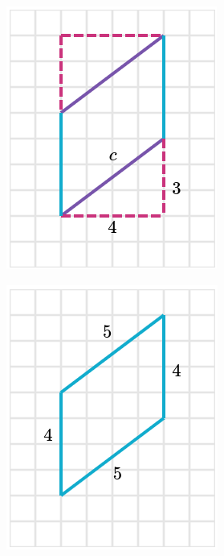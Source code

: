 \begin{solutionbox}{16cm}
\begin{minipage}{0.4\textwidth}
\begin{multicols}{2}
\begin{figure}[H]
                \includegraphics[width=0.9\linewidth]{../images/peri_paralelogramo_01c.png}
                \caption{}
                \label{fig:peri_paralelogramo_01c}
            \end{figure}
            \begin{figure}[H]
                \centering
                \includegraphics[width=0.9\linewidth]{../images/peri_paralelogramo_01d.png}

\end{figure}
\end{multicols}
\end{minipage}
\end{solutionbox}
